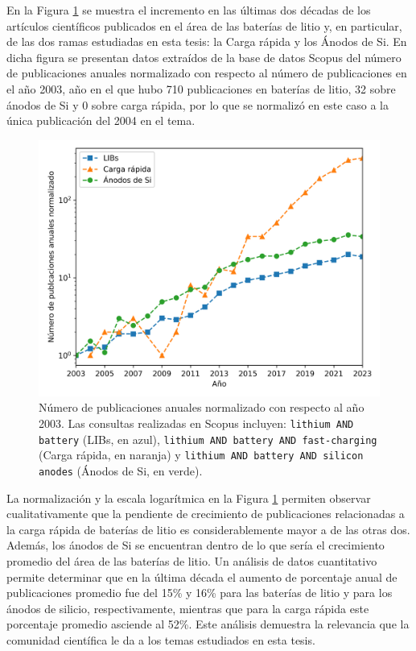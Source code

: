 En la Figura \ref{fig:scopus} se muestra el incremento en las últimas dos décadas
de los artículos científicos publicados en el área de las baterías de litio y, en 
particular, de las dos ramas estudiadas en esta tesis: la Carga rápida y los 
Ánodos de Si. En dicha figura se presentan datos extraídos de la base de datos 
Scopus \cite{SCOPUS} del número de publicaciones anuales normalizado con respecto 
al número de publicaciones en el año 2003, año en el que hubo 710 publicaciones 
en baterías de litio, 32 sobre ánodos de Si y 0 sobre carga rápida, por lo que 
se normalizó en este caso a la única publicación del 2004 en el tema.
\begin{figure}[h!]
    \centering
    \includegraphics[width=.8\textwidth]{Introduccion/baterias/scopus.png}
    \caption{Número de publicaciones anuales normalizado con respecto al año 2003. 
    Las consultas realizadas en Scopus \cite{SCOPUS} incluyen: 
    \texttt{lithium AND battery} (LIBs, en azul), \texttt{lithium AND battery AND 
    fast-charging} (Carga rápida, en naranja) y \texttt{lithium AND battery AND 
    silicon anodes} (Ánodos de Si, en verde).}
    \label{fig:scopus}
\end{figure}
La normalización y la escala logarítmica en la Figura \ref{fig:scopus} permiten
observar cualitativamente que la pendiente de crecimiento de publicaciones 
relacionadas a la carga rápida de baterías de litio es considerablemente mayor a 
de las otras dos. Además, los ánodos de Si se encuentran dentro de lo que sería
el crecimiento promedio del área de las baterías de litio. Un análisis de datos
cuantitativo permite determinar que en la última década el aumento de porcentaje
anual de publicaciones promedio fue del 15\% y 16\% para las baterías de litio 
y para los ánodos de silicio, respectivamente, mientras que para la carga rápida 
este porcentaje promedio asciende al 52\%. Este análisis demuestra la relevancia
que la comunidad científica le da a los temas estudiados en esta tesis.
